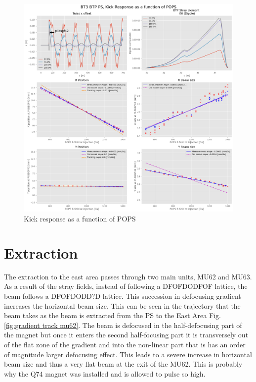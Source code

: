 \documentclass[a4paper,
               biblatex,     %
               keeplastbox,   %
               ]{jacow}
\begin{document}
\begin{figure}[!htb]
   \centering
   \includegraphics*[width=1.0\columnwidth]{kick_response_old_model.png}
   \caption{Kick response as a function of POPS}
   \label{fig:kick_response_old_model}
\end{figure}

\section{Extraction}

The extraction to the east area passes through two main units, MU62 and MU63. As a result of the stray fields, instead of following a DFOFDODFOF lattice, the beam follows a DFOFDODD?D lattice. This succession in defocusing gradient increases the horizontal beam size. This can be seen in the trajectory that the beam takes as the beam is extracted from the PS to the East Area Fig. \ref{fig:gradient track mu62}. The beam is defocused in the half-defocusing part of the magnet but once it enters the second half-focusing part it is transversely out of the flat zone of the gradient and into the non-linear part that is has an order of magnitude larger defocusing effect. This leads to a severe increase in horizontal beam size and thus a very flat beam at the exit of the MU62. This is probably why the Q74 magnet was installed and is allowed to pulse so high.
\end{document}
